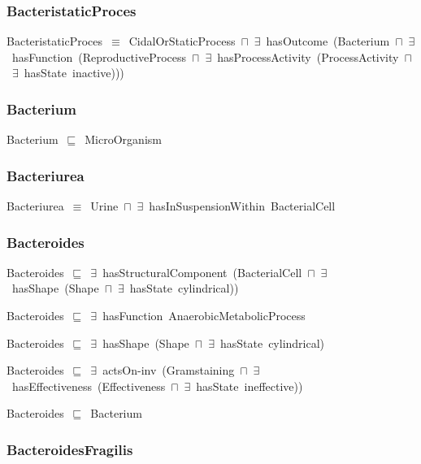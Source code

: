 \documentclass{article}
\begin{document}
\subsubsection*{BacteristaticProces}

BacteristaticProces~\ensuremath{\equiv}~CidalOrStaticProcess~\ensuremath{\sqcap}~\ensuremath{\exists}~hasOutcome~(Bacterium~\ensuremath{\sqcap}~\ensuremath{\exists}~hasFunction~(ReproductiveProcess~\ensuremath{\sqcap}~\ensuremath{\exists}~hasProcessActivity~(ProcessActivity~\ensuremath{\sqcap}~\ensuremath{\exists}~hasState~inactive)))

\subsubsection*{Bacterium}

Bacterium~\ensuremath{\sqsubseteq}~MicroOrganism~

\subsubsection*{Bacteriurea}

Bacteriurea~\ensuremath{\equiv}~Urine~\ensuremath{\sqcap}~\ensuremath{\exists}~hasInSuspensionWithin~BacterialCell

\subsubsection*{Bacteroides}

Bacteroides~\ensuremath{\sqsubseteq}~\ensuremath{\exists}~hasStructuralComponent~(BacterialCell~\ensuremath{\sqcap}~\ensuremath{\exists}~hasShape~(Shape~\ensuremath{\sqcap}~\ensuremath{\exists}~hasState~cylindrical))~

Bacteroides~\ensuremath{\sqsubseteq}~\ensuremath{\exists}~hasFunction~AnaerobicMetabolicProcess~

Bacteroides~\ensuremath{\sqsubseteq}~\ensuremath{\exists}~hasShape~(Shape~\ensuremath{\sqcap}~\ensuremath{\exists}~hasState~cylindrical)~

Bacteroides~\ensuremath{\sqsubseteq}~\ensuremath{\exists}~actsOn-inv~(Gramstaining~\ensuremath{\sqcap}~\ensuremath{\exists}~hasEffectiveness~(Effectiveness~\ensuremath{\sqcap}~\ensuremath{\exists}~hasState~ineffective))~

Bacteroides~\ensuremath{\sqsubseteq}~Bacterium~

\subsubsection*{BacteroidesFragilis}
\end{document}

